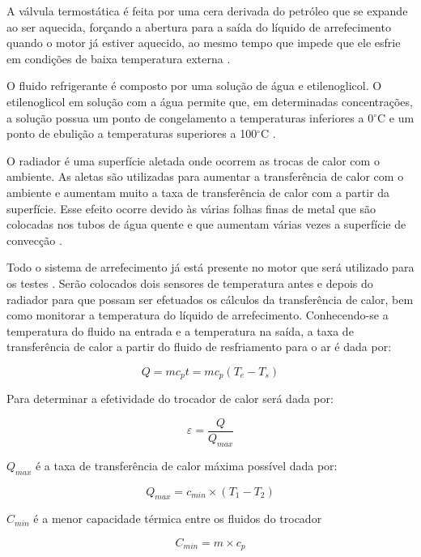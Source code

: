 A válvula termostática é feita por uma cera derivada do petróleo que se expande ao ser aquecida, forçando a abertura para a saída do líquido de arrefecimento quando o motor já estiver aquecido, ao mesmo tempo que impede que ele esfrie em condições de baixa temperatura externa \cite{energiaToyota}.  

O fluido refrigerante é composto por uma solução de água e etilenoglicol. O etilenoglicol em solução com a água permite que, em determinadas concentrações, a solução possua um ponto de congelamento a temperaturas inferiores a 0$^{\circ}$C e um ponto de ebulição a temperaturas superiores a 100$^{\circ}$C \cite{energiaToyota}. %

O radiador é uma superfície aletada onde ocorrem as trocas de calor com o ambiente. As aletas são utilizadas para aumentar a transferência de calor com o ambiente e aumentam muito a taxa de transferência de calor com a partir da superfície.  Esse efeito ocorre devido às várias folhas finas de metal que são colocadas nos tubos de água quente e que aumentam várias vezes a superfície de convecção \cite{energiaTransferencia}.

Todo o sistema de arrefecimento já está presente no motor que será utilizado para os testes . Serão colocados dois sensores de temperatura antes e depois do radiador para que possam ser efetuados os cálculos da transferência de calor, bem como monitorar a temperatura do líquido de arrefecimento. Conhecendo-se a temperatura do fluido na entrada e a temperatura na saída, a taxa de transferência de calor a partir do fluido de resfriamento para o ar é dada por:

\begin{equation}
	Q = mc_{p}t = mc_{p}(T_{e} - T_{s})
\end{equation}

Para determinar a efetividade do trocador de calor será dada por:

\begin{equation}
	\varepsilon = \frac{Q}{Q_{max}}
\end{equation}

$Q_{max}$ é a taxa de transferência de calor máxima possível dada por:

\begin{equation}
	Q_{max} = c_{min} \times (T_{1} - T_{2})
\end{equation}

$C_{min}$ é a menor capacidade térmica entre os fluidos do trocador

\begin{equation}
	C_{min} = m \times c_{p}
\end{equation}

